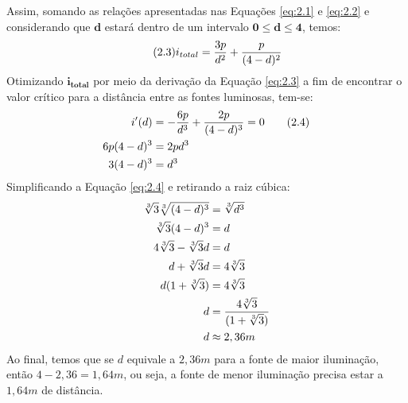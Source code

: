 \documentclass{article}
\begin{document}
Assim, somando as relações apresentadas nas Equações \ref{eq:2.1} e \ref{eq:2.2} e considerando que $\mathbf{d}$ estará dentro de um intervalo $\mathbf{0 \leqslant d \leqslant 4}$, temos:
\begin{equation}\tag{2.3}
    \label{eq:2.3}
    i_{total} = {{3p \over d^2} + {p \over {(4-d)^2}}}
\end{equation}
Otimizando $\mathbf{i_{total}}$ por meio da derivação da Equação \ref{eq:2.3} a fim de encontrar o valor crítico para a distância entre as fontes luminosas, tem-se:
\begin{align}
    \label{eq:2.4}
    i'(d)       & = {-{6p \over d^3} + {2p \over {(4-d)^3}}} = 0 \tag{2.4} \\
    6p(4-d)^{3} & = 2pd^{3} \nonumber                                      \\
    3(4-d)^{3}  & = d^{3} \nonumber
\end{align}
Simplificando a Equação \ref{eq:2.4} e retirando a raiz cúbica:
\begin{align}
    \label{eq:2.5}
    \sqrt[3]{3}\sqrt[3]{(4-d)^{3}} & = \sqrt[3]{d^{3}} \nonumber                            \\
    \sqrt[3]{3}(4-d)^{3}           & = d \nonumber                                          \\
    4\sqrt[3]{3}-\sqrt[3]{3}d      & = d \nonumber                                          \\
    d + \sqrt[3]{3}d               & = 4\sqrt[3]{3} \nonumber                               \\
    d(1 + \sqrt[3]{3})             & = 4\sqrt[3]{3} \nonumber                               \\
    d                              & = {{4\sqrt[3]{3}} \over {(1 + \sqrt[3]{3})}} \nonumber \\
    d                              & \approx 2,36m \nonumber
\end{align}
Ao final, temos que se $d$ equivale a $2,36m$ para a fonte de maior iluminação, então $4 - 2,36 = 1,64m$, ou seja, a fonte de menor iluminação precisa estar a $1,64m$ de distância.
\end{document}
